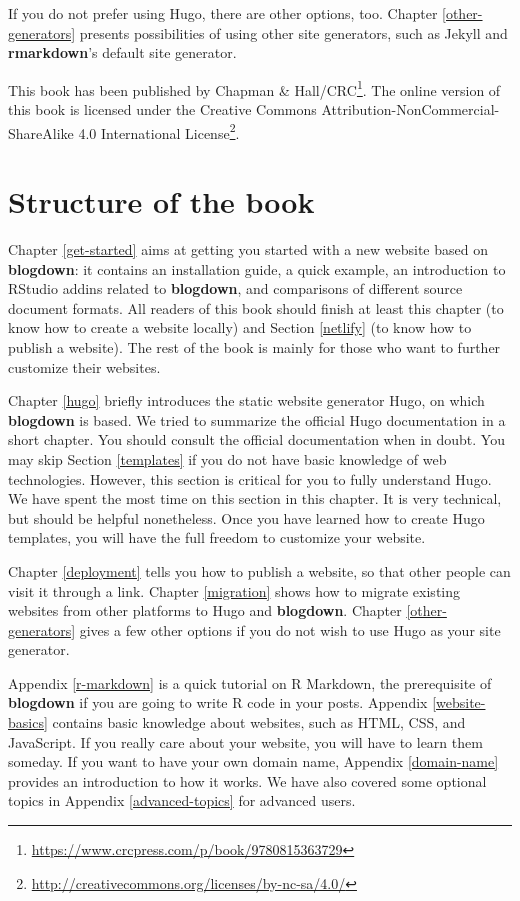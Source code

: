 \documentclass[12pt,]{krantz}
\renewcommand{\href}[2]{#2\footnote{\url{#1}}}
\theoremstyle{definition}
\theoremstyle{definition}
\theoremstyle{definition}
\theoremstyle{remark}
\begin{document}
If you do not prefer using Hugo, there are other options, too. Chapter
\ref{other-generators} presents possibilities of using other site
generators, such as Jekyll and \textbf{rmarkdown}'s default site
generator.

This book has been published by
\href{https://www.crcpress.com/p/book/9780815363729}{Chapman \&
Hall/CRC}. The online version of this book is licensed under the
\href{http://creativecommons.org/licenses/by-nc-sa/4.0/}{Creative
Commons Attribution-NonCommercial-ShareAlike 4.0 International License}.

\hypertarget{structure-of-the-book}{%
\section*{Structure of the book}\label{structure-of-the-book}}


Chapter \ref{get-started} aims at getting you started with a new website
based on \textbf{blogdown}: it contains an installation guide, a quick
example, an introduction to RStudio addins related to \textbf{blogdown},
and comparisons of different source document formats. All readers of
this book should finish at least this chapter (to know how to create a
website locally) and Section \ref{netlify} (to know how to publish a
website). The rest of the book is mainly for those who want to further
customize their websites.

Chapter \ref{hugo} briefly introduces the static website generator Hugo,
on which \textbf{blogdown} is based. We tried to summarize the official
Hugo documentation in a short chapter. You should consult the official
documentation when in doubt. You may skip Section \ref{templates} if you
do not have basic knowledge of web technologies. However, this section
is critical for you to fully understand Hugo. We have spent the most
time on this section in this chapter. It is very technical, but should
be helpful nonetheless. Once you have learned how to create Hugo
templates, you will have the full freedom to customize your website.

Chapter \ref{deployment} tells you how to publish a website, so that
other people can visit it through a link. Chapter \ref{migration} shows
how to migrate existing websites from other platforms to Hugo and
\textbf{blogdown}. Chapter \ref{other-generators} gives a few other
options if you do not wish to use Hugo as your site generator.

Appendix \ref{r-markdown} is a quick tutorial on R Markdown, the
prerequisite of \textbf{blogdown} if you are going to write R code in
your posts. Appendix \ref{website-basics} contains basic knowledge about
websites, such as HTML, CSS, and JavaScript. If you really care about
your website, you will have to learn them someday. If you want to have
your own domain name, Appendix \ref{domain-name} provides an
introduction to how it works. We have also covered some optional topics
in Appendix \ref{advanced-topics} for advanced users.
\end{document}
